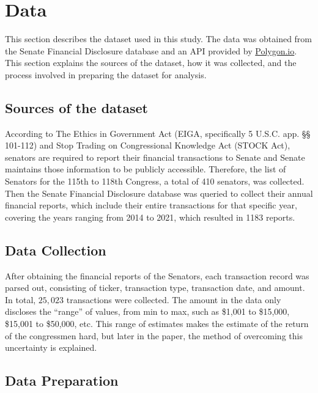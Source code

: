 \documentclass[12pt,letterpaper]{article}
\begin{document}
\section{Data}

This section describes the dataset used in this study. The data was obtained from the Senate Financial Disclosure database and an API provided by \url{Polygon.io}. This section explains the sources of the dataset, how it was collected, and the process involved in preparing the dataset for analysis.


\subsection{Sources of the dataset}

According to The Ethics in Government Act (EIGA, specifically 5 U.S.C. app. §§ 101-112) and Stop Trading on Congressional Knowledge Act (STOCK Act), senators are required to report their financial transactions to Senate and Senate maintains those information to be publicly accessible. Therefore, the list of Senators for the 115th to 118th Congress, a total of 410 senators, was collected. Then the Senate Financial Disclosure database was queried to collect their annual financial reports, which include their entire transactions for that specific year, covering the years ranging from 2014 to 2021, which resulted in 1183 reports.


\subsection{Data Collection}

After obtaining the financial reports of the Senators, each transaction record was parsed out, consisting of ticker, transaction type, transaction date, and amount. In total, $25,023$ transactions were collected. The amount in the data only discloses the ``range'' of values, from min to max, such as \$1,001 to \$15,000, \$15,001 to \$50,000, etc. This range of estimates makes the estimate of the return of the congressmen hard, but later in the paper, the method of overcoming this uncertainty is explained.


\subsection{Data Preparation}
\end{document}
